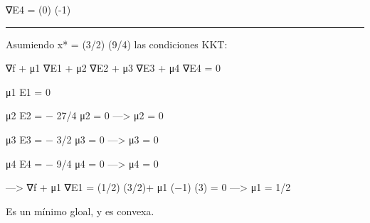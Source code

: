 \documentclass[11pt]{article}
\begin{document}
∇E4 = (0) (-1)

\begin{center}\rule{0.5\linewidth}{\linethickness}\end{center}

Asumiendo x* = (3/2) (9/4) las condiciones KKT:

∇f + μ1 ∇E1 + μ2 ∇E2 + μ3 ∇E3 + μ4 ∇E4 = 0

μ1 E1 = 0

μ2 E2 = − 27/4 μ2 = 0 ---\textgreater{} μ2 = 0

μ3 E3 = − 3/2 μ3 = 0 ---\textgreater{} μ3 = 0

μ4 E4 = − 9/4 μ4 = 0 ---\textgreater{} μ4 = 0

---\textgreater{} ∇f + μ1 ∇E1 = (1/2) (3/2)+ μ1 (−1) (3) = 0
---\textgreater{} μ1 = 1/2

Es un mínimo gloal, y es convexa.
\end{document}
